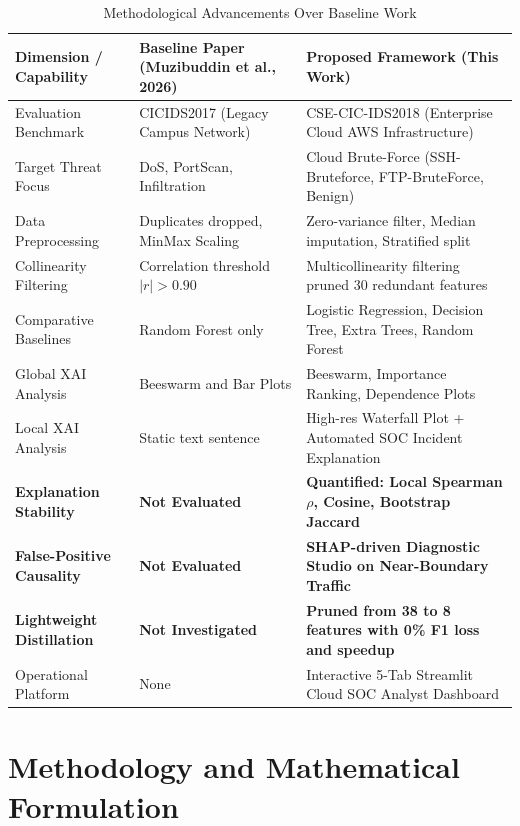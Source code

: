 \documentclass[conference]{IEEEtran}
\begin{document}
\begin{table}[t]
\caption{Methodological Advancements Over Baseline Work}
\label{tab:comparison_literature}
\centering
\begin{tabular}{lll}
\toprule
\textbf{Dimension / Capability} & \textbf{{Baseline Paper (Muzibuddin et al., 2026)\cite{muzibuddin2026explainable}}} & \textbf{Proposed Framework (This Work)} \\
\midrule
Evaluation Benchmark & CICIDS2017 (Legacy Campus Network) & CSE-CIC-IDS2018 (Enterprise Cloud AWS Infrastructure) \\
Target Threat Focus & DoS, PortScan, Infiltration & Cloud Brute-Force (SSH-Bruteforce, FTP-BruteForce, Benign) \\
Data Preprocessing & Duplicates dropped, MinMax Scaling & Zero-variance filter, Median imputation, Stratified split \\
Collinearity Filtering & Correlation threshold $|r| > 0.90$ & Multicollinearity filtering pruned $30$ redundant features \\
Comparative Baselines & Random Forest only & Logistic Regression, Decision Tree, Extra Trees, Random Forest \\
Global XAI Analysis & Beeswarm and Bar Plots & Beeswarm, Importance Ranking, Dependence Plots \\
Local XAI Analysis & Static text sentence & High-res Waterfall Plot + Automated SOC Incident Explanation \\
\textbf{Explanation Stability} & \textbf{Not Evaluated} & \textbf{Quantified: Local Spearman $\rho$, Cosine, Bootstrap Jaccard} \\
\textbf{False-Positive Causality} & \textbf{Not Evaluated} & \textbf{SHAP-driven Diagnostic Studio on Near-Boundary Traffic} \\
\textbf{Lightweight Distillation} & \textbf{Not Investigated} & \textbf{Pruned from 38 to 8 features with 0\% F1 loss and speedup} \\
Operational Platform & None & Interactive 5-Tab Streamlit Cloud SOC Analyst Dashboard \\
\bottomrule
\end{tabular}
\end{table}

\section{Methodology and Mathematical Formulation}
\end{document}
